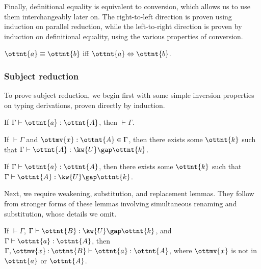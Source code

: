 \documentclass[a4paper,UKenglish,cleveref,autoref,thm-restate]{lipics-v2021}
\begin{document}
Finally, definitional equality is equivalent to conversion,
which allows us to use them interchangeably later on.
The right-to-left direction is proven using induction on parallel reduction,
while the left-to-right direction is proven by induction on definitional equality,
using the various properties of conversion.

\begin{theorem} \label{lem:eq-conv}
  $ \ottnt{a}  \equiv  \ottnt{b} $ iff $ \ottnt{a}  \Leftrightarrow  \ottnt{b} $.
\end{theorem}

\subsubsection{Subject reduction}

To prove subject reduction,
we begin first with some simple inversion properties on typing derivations,
proven directly by induction.

\begin{lemma} \label{lem:wt:wf}
  If $ \Gamma  \vdash  \ottnt{a}  \mathrel{:}  \ottnt{A} $, then $ \mathop{\vdash}  \Gamma $.  
\end{lemma}

\begin{lemma}
  If $ \mathop{\vdash}  \Gamma $ and $ \ottmv{x}  \mathrel{:}  \ottnt{A}  \in  \Gamma $,
  then there exists some $\ottnt{k}$ such that $ \Gamma  \vdash  \ottnt{A}  \mathrel{:}   \kw{U} \gap  \ottnt{k}  $.
\end{lemma}

\begin{lemma}[Regularity] \label{lem:wt:reg}
  If $ \Gamma  \vdash  \ottnt{a}  \mathrel{:}  \ottnt{A} $, then there exists some $\ottnt{k}$ such that
  $ \Gamma  \vdash  \ottnt{A}  \mathrel{:}   \kw{U} \gap  \ottnt{k}  $.
\end{lemma}

Next, we require weakening, substitution, and replacement lemmas.
They follow from stronger forms of these lemmas involving simultaneous renaming and substitution,
whose details we omit.

\begin{lemma}[Weakening (w.t.)] \label{lem:wt:weak}
  If $ \mathop{\vdash}  \Gamma $, $ \Gamma  \vdash  \ottnt{B}  \mathrel{:}   \kw{U} \gap  \ottnt{k}  $, and $ \Gamma  \vdash  \ottnt{a}  \mathrel{:}  \ottnt{A} $,
  then $  \Gamma ,  \ottmv{x}  \mathbin{:}  \ottnt{B}   \vdash  \ottnt{a}  \mathrel{:}  \ottnt{A} $, where $\ottmv{x}$ is not in $\ottnt{a}$ or $\ottnt{A}$.
\end{lemma}
\end{document}
